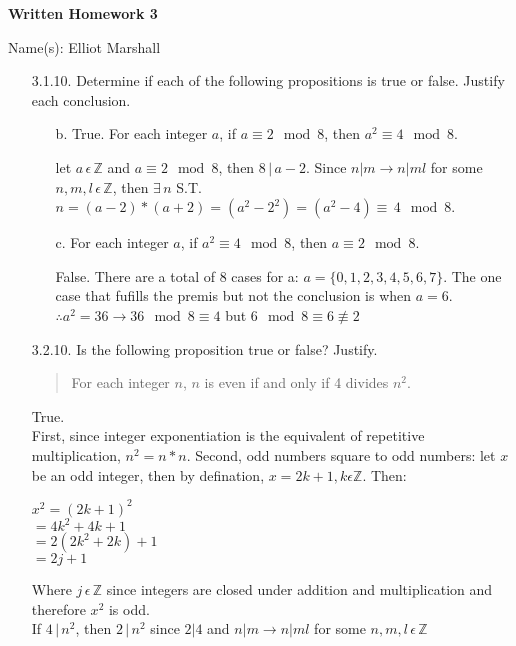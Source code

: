 \documentclass[12pt]{article}
\newcommand{\Z}{\mathbb{Z}}
\begin{document}
\centerline{\bf Written Homework 3}


\centerline{Name(s): Elliot Marshall}
\begin{enumerate}
\item[3.1.10.] Determine if each of the following propositions is true or false.  Justify each conclusion.
\begin{enumerate}
\item[b.] True. For each integer $a$, if $a\equiv 2 \mod 8$, then $a^2\equiv 4 \mod 8$.
\par let $a\,\epsilon\,\Z $ and $a \equiv 2 \mod 8$, then $8\,|\, a - 2$. Since 
$n|m\rightarrow n|ml$ for some $n,m,l\,\epsilon\,\Z$, then $\exists\,n$ S.T. 
$n=(a-2)*(a+2) = (a^2-2^2) = (a^2-4)\equiv\,4\mod 8$.
\item[c.] For each integer $a$, if $a^2\equiv 4 \mod 8$, then $a\equiv 2 \mod 8$.
\par False. There are a total of 8 cases for a: $a = \{0,1,2,3,4,5,6,7\}$. The one case 
that fufills the premis but not the conclusion is when $a = 6 $. $\therefore 
a^2 = 36 \rightarrow 36\mod8\equiv4$ but $6\mod8\equiv6\not\equiv2$
\end{enumerate}

\hrulefill


\item[3.2.10.] Is the following proposition true or false?  Justify.
\begin{quote} For each integer $n$, $n$ is even if and only if 4 divides $n^2$.
\end{quote}
\par True.\\
First, since integer exponentiation is the equivalent of repetitive multiplication, $n^2 = n*n$.
Second, odd numbers square to odd numbers: let $x$ be an odd integer, then by defination, $x = 
2k+1, k\epsilon\Z$. Then: \begin{center} $x^2 = (2k+1)^2$\\$=4k^2+4k+1$\\$=2(2k^2+2k)+1$
\\$=2j+1$\end{center} Where $j\,\epsilon\,\Z$ since integers are closed under addition and 
multiplication and therefore $x^2$ is odd.\\
If $4\,|\,n^2$, then $2\,|\,n^2$ since $2|4$ and $n|m\rightarrow n|ml$ for some $n,m,l\,\epsilon
\,\Z$



\end{enumerate}
\end{document}

